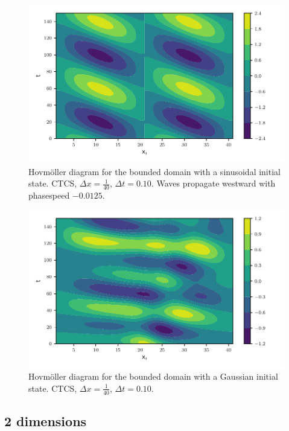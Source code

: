 \begin{figure}[H]
  \centering
  \includegraphics[width=\textwidth]{../figures/psi_bounded_centered_sine.pdf}
  \caption{Hovmöller diagram for the bounded domain with a sinusoidal initial
  state. CTCS, $\Delta x = \frac{1}{40}$, $\Delta t = 0.10$.
  Waves propagate westward with phasespeed $-0.0125$.}
  \label{fig:bounded_sine}
\end{figure}


\begin{figure}[H]
  \centering
  \includegraphics[width=\textwidth]{../figures/psi_bounded_centered_gauss.pdf}
  \caption{Hovmöller diagram for the bounded domain with a Gaussian initial state. CTCS, $\Delta x = \frac{1}{40}$, $\Delta t = 0.10$.}
  \label{fig:bounded_gauss}
\end{figure}


\subsection{2 dimensions}

